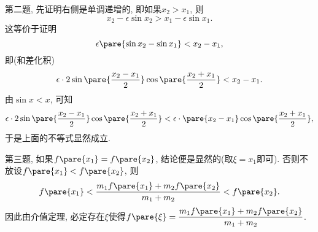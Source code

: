 \documentclass{ctexart}
\begin{document}
第二题, 先证明右侧是单调递增的, 即如果$x_2 > x_1$, 则
\[ x_2 - \epsilon \sin x_2 > x_1 - \epsilon \sin x_1. \]
这等价于证明
\[ \epsilon\pare{\sin x_2 - \sin x_1} < x_2 - x_1, \]
即(和差化积)
\[ \epsilon\cdot 2\sin\pare{\frac{x_2-x_1}{2}} \cos\pare{\frac{x_2+x_1}{2}} < x_2 - x_1. \]
由$\sin x < x$, 可知
\[ \epsilon\cdot 2\sin\pare{\frac{x_2-x_1}{2}} \cos\pare{\frac{x_2+x_1}{2}} < \epsilon\cdot \pare{x_2 - x_1} \cos\pare{\frac{x_2+x_1}{2}}, \]
于是上面的不等式显然成立.
\par
第三题, 如果$f\pare{x_1} = f\pare{x_2}$, 结论便是显然的(取$\xi = x_1$即可). 否则不放设$f\pare{x_1} < f\pare{x_2}$, 则
\[ f\pare{x_1} < \frac{m_1 f\pare{x_1} + m_2 f\pare{x_2}}{m_1 + m_2} < f\pare{x_2}. \]
因此由介值定理, 必定存在$\xi$使得$f\pare{\xi} = \displaystyle \frac{m_1 f\pare{x_1} + m_2 f\pare{x_2}}{m_1 + m_2}$.
\end{document}
